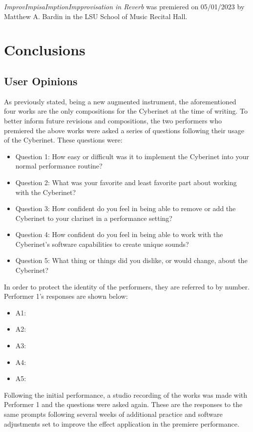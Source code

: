 \textit{ImprovImpisaImptionImpprovisation in Reverb} was premiered on 05/01/2023 by Matthew A. Bardin in the LSU School of Music Recital Hall.

\chapter{Conclusions} %

\section{User Opinions}

As previously stated, being a new augmented instrument, the aforementioned four works are the only compositions for the Cyberinet at the time of writing. To better inform future revisions and compositions, the two performers who premiered the above works were asked a series of questions following their usage of the Cyberinet. These questions were:

\begin{itemize}
    \item Question 1: How easy or difficult was it to implement the Cyberinet into your normal performance routine?
    \item Question 2: What was your favorite and least favorite part about working with the Cyberinet? 
    \item Question 3: How confident do you feel in being able to remove or add the Cyberinet to your clarinet in a performance setting?
    \item Question 4: How confident do you feel in being able to work with the Cyberinet's software capabilities to create unique sounds?
    \item Question 5: What thing or things did you dislike, or would change, about the Cyberinet?
\end{itemize}

In order to protect the identity of the performers, they are referred to by number. Performer 1's responses are shown below: %

\begin{itemize}
    \item A1:
    \item A2:
    \item A3:
    \item A4:
    \item A5:
\end{itemize}

Following the initial performance, a studio recording of the works was made with Performer 1 and the questions were asked again. These are the responses to the same prompts following several weeks of additional practice and software adjustments set to improve the effect application in the premiere performance. 

